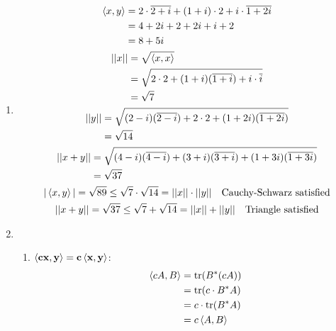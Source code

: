 \documentclass[12pt]{article}
\begin{document}
\begin{enumerate}
      \item \begin{gather*}
                  \begin{aligned}
                        \braket{x,y} & =2\cdot\overline{2+i}+(1+i) \cdot 2+i\cdot\overline{1+2i} \\
                                     & =4+2i+2+2i+i+2                                            \\
                                     & =8+5i
                  \end{aligned} \\
                  \begin{aligned}
                        ||x|| & = \sqrt{\braket{x, x}}                                          \\
                              & =\sqrt{2 \cdot 2 +  (1+i)(\overline{1+i})+i \cdot \overline{i}} \\
                              & =\sqrt{7}
                  \end{aligned} \\
                  \begin{aligned}
                        ||y|| & =  \sqrt{(2-i)(\overline{2-i})+2 \cdot 2+(1+2i)(\overline{1+2i})} \\
                              & =\sqrt{14}
                  \end{aligned} \\
                  \begin{aligned}
                        ||x+y|| & = \sqrt{(4-i)(\overline{4-i}) + (3+i)(\overline{3+i}) + (1+3i)(\overline{1+3i})} \\
                                & = \sqrt{37}
                  \end{aligned} \\
                  |\braket{x,y}|=\sqrt{89} \le \sqrt{7} \cdot \sqrt{14} = ||x|| \cdot ||y||\quad\text{Cauchy-Schwarz satisfied} \\
                  ||x+y||=\sqrt{37} \le \sqrt{7}+\sqrt{14}=||x||+||y||\quad\text{Triangle satisfied}
            \end{gather*}
      \item \begin{enumerate}
                  \item $\mathbf{\braket{cx, y}=c\braket{x, y}}$:
                        \begin{align*}
                              \braket{cA, B} & = \text{tr}(B^* (cA))      \\
                                             & = \text{tr}(c \cdot B^* A) \\
                                             & = c \cdot \text{tr}(B^* A) \\
                                             & = c\braket{A, B}
                        \end{align*}


\end{enumerate}
\end{enumerate}
\end{document}
